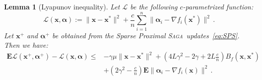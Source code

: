 \documentclass{article}
\newcommand{\Econd}{\mathbf{E}}
\newcommand{\SAGA}{\textsc{Saga}}
\def\xx{{\boldsymbol x}}
\newtheorem{lemma}{Lemma}
\begin{document}
\begin{lemma}[Lyapunov inequality]\label{lemma:lyapunov_inequality}
  Let $\mathcal{L}$ be the following $c$-parametrized function:
\begin{equation}\label{eq:lyapunov}
  \mathcal{L}(\xx,{\boldsymbol\alpha}) := \|\xx - \xx^*\|^2 + \frac{c}{n} \sum_{i=1}^n \|{\boldsymbol\alpha}_i - \nabla f_i(\xx^*)\|^2 \, .
\end{equation}
  Let $\xx^+$ and ${\boldsymbol\alpha}^+$ be obtained from the Sparse Proximal \SAGA\ updates~\eqref{eq:SPS}.
  Then we have:
\begin{align}
  \Econd \mathcal{L}(\xx^+,{\boldsymbol\alpha}^+) - \mathcal{L}(\xx,{\boldsymbol\alpha}) \leq  &- \gamma \mu \|\xx - \xx^*\|^2 +  \left(4 L \gamma^2 - 2 \gamma + 2L\frac{c}{n}\right) B_f(\xx, \xx^*)
  \nonumber \\
  &+ \left(2 \gamma^2 - \frac{c}{n}\right) \Econd \|{\boldsymbol\alpha}_i - \nabla f_i(\xx)\|^2\,.
\end{align}
\end{lemma}
\end{document}
